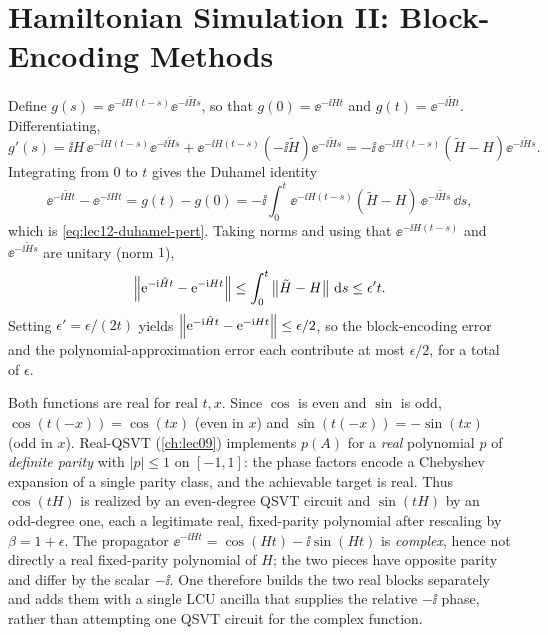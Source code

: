 \chapter{Hamiltonian Simulation II: Block-Encoding Methods}

\begin{solution}
Define $g(s)=\ee^{-\ii H(t-s)}\ee^{-\ii\tilde Hs}$, so that $g(0)=\ee^{-\ii Ht}$ and
$g(t)=\ee^{-\ii\tilde Ht}$. Differentiating,
\[
  g'(s)=\ii H\,\ee^{-\ii H(t-s)}\ee^{-\ii\tilde Hs}
       +\ee^{-\ii H(t-s)}(-\ii\tilde H)\ee^{-\ii\tilde Hs}
       =-\ii\,\ee^{-\ii H(t-s)}(\tilde H-H)\ee^{-\ii\tilde Hs}.
\]
Integrating from $0$ to $t$ gives the Duhamel identity
\[
  \ee^{-\ii\tilde Ht}-\ee^{-\ii Ht}=g(t)-g(0)
  =-\ii\int_0^t\ee^{-\ii H(t-s)}(\tilde H-H)\,\ee^{-\ii\tilde Hs}\,\dd s,
\]
which is \eqref{eq:lec12-duhamel-pert}. Taking norms and using that $\ee^{-\ii H(t-s)}$ and
$\ee^{-\ii\tilde Hs}$ are unitary (norm $1$),
\[
  \left\lVert \mathrm{e}^{-\mathrm{i}\tilde Ht}-\mathrm{e}^{-\mathrm{i} Ht} \right\rVert
  \le\int_0^t\left\lVert \tilde H-H \right\rVert\,\mathrm{d} s\le\epsilon' t.
\]
Setting $\epsilon'=\epsilon/(2t)$ yields
$\left\lVert \mathrm{e}^{-\mathrm{i}\tilde Ht}-\mathrm{e}^{-\mathrm{i} Ht} \right\rVert\le\epsilon/2$, so the block-encoding error and the
polynomial-approximation error each contribute at most $\epsilon/2$, for a total of
$\epsilon$.
\end{solution}

\begin{solution}
Both functions are real for real $t,x$. Since $\cos$ is even and $\sin$ is odd,
$\cos(t(-x))=\cos(tx)$ (even in $x$) and $\sin(t(-x))=-\sin(tx)$ (odd in $x$). Real-QSVT
(\cref{ch:lec09}) implements $p(A)$ for a \emph{real} polynomial $p$ of \emph{definite
parity} with $|p|\le1$ on $[-1,1]$: the phase factors encode a Chebyshev expansion of a
single parity class, and the achievable target is real. Thus $\cos(tH)$ is realized by an
even-degree QSVT circuit and $\sin(tH)$ by an odd-degree one, each a legitimate real,
fixed-parity polynomial after rescaling by $\beta=1+\epsilon$. The propagator
$\ee^{-\ii Ht}=\cos(Ht)-\ii\sin(Ht)$ is \emph{complex}, hence not directly a real
fixed-parity polynomial of $H$; the two pieces have opposite parity and differ by the
scalar $-\ii$. One therefore builds the two real blocks separately and adds them with a
single LCU ancilla that supplies the relative $-\ii$ phase, rather than attempting one QSVT
circuit for the complex function.
\end{solution}

